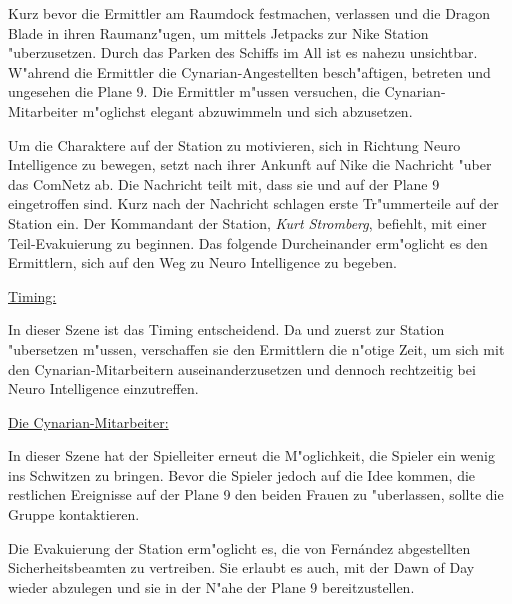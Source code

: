 Kurz bevor die Ermittler am Raumdock festmachen, verlassen \xl{} und \ml{} die Dragon Blade in ihren Raumanz"ugen, um mittels Jetpacks zur Nike Station "uberzusetzen. Durch das Parken des Schiffs im All ist es nahezu unsichtbar. W"ahrend die Ermittler die Cynarian-Angestellten besch"aftigen, betreten \xl{} und \ml{} ungesehen die Plane 9. Die Ermittler m"ussen versuchen, die Cynarian-Mitarbeiter m"oglichst elegant abzuwimmeln und sich abzusetzen.

Um die Charaktere auf der Station zu motivieren, sich in Richtung Neuro Intelligence zu bewegen, setzt \ml{} nach ihrer Ankunft auf Nike die Nachricht  "uber das ComNetz ab. Die Nachricht teilt mit, dass sie und \xl{} auf der Plane 9 eingetroffen sind. Kurz nach der Nachricht schlagen erste Tr"ummerteile auf der Station ein. Der Kommandant der Station, \emph{Kurt Stromberg}, befiehlt, mit einer Teil-Evakuierung zu beginnen. Das folgende Durcheinander erm"oglicht es den Ermittlern, sich auf den Weg zu Neuro Intelligence zu begeben. 

\begin{remarks}
	\underline{Timing:}

	In dieser Szene ist das Timing entscheidend. Da \xl{} und \ml{} zuerst zur Station "ubersetzen m"ussen, verschaffen sie den Ermittlern die n"otige Zeit, um sich mit den Cynarian-Mitarbeitern auseinanderzusetzen und dennoch rechtzeitig bei Neuro Intelligence einzutreffen.

	\underline{Die Cynarian-Mitarbeiter:}

	In dieser Szene hat der Spielleiter erneut die M"oglichkeit, die Spieler ein wenig ins Schwitzen zu bringen. Bevor die Spieler jedoch auf die Idee kommen, die restlichen Ereignisse auf der Plane 9 den beiden Frauen zu "uberlassen, sollte \ml{} die Gruppe kontaktieren.

	Die Evakuierung der Station erm"oglicht es, die von Fern\'andez abgestellten Sicherheitsbeamten zu vertreiben. Sie erlaubt es auch, mit der Dawn of Day wieder abzulegen und sie in der N"ahe der Plane 9 bereitzustellen.
\end{remarks}
